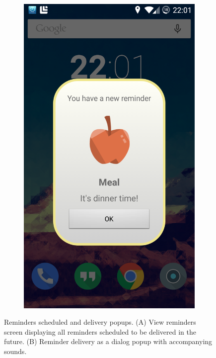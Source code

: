 \begin{figure}[]
\begin{subfigure}[t]{0.48\textwidth}
      \includegraphics[width=\textwidth]{Files/treatment-study-1/figures/app-reminderpopup}
        \caption{}
        \label{fig: taut-reminderpopup}
    \end{subfigure}
      \caption{Reminders scheduled and delivery popups. (A) View reminders screen displaying all reminders scheduled to be delivered in the future. (B) Reminder delivery as a dialog popup with accompanying sounds.}
    \label{fig: taut-reminderlist-delivery}
\end{figure}

